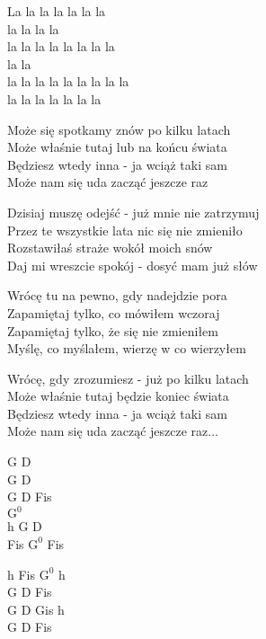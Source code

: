 \begin{text}
    La la la la la la la\\
    la la la la\\
    la la la la la la la la\\
    la la\\
    la la la la la la la la la\\
    la la la la la la la

    Może się spotkamy znów po kilku latach\\
    Może właśnie tutaj lub na końcu świata\\
    Będziesz wtedy inna - ja wciąż taki sam\\
    Może nam się uda zacząć jeszcze raz

    Dzisiaj muszę odejść - już mnie nie zatrzymuj\\
    Przez te wszystkie lata nic się nie zmieniło\\
    Rozstawiłaś straże wokół moich snów\\
    Daj mi wreszcie spokój - dosyć mam już słów

    Wrócę tu na pewno, gdy nadejdzie pora\\
    Zapamiętaj tylko, co mówiłem wczoraj\\
    Zapamiętaj tylko, że się nie zmieniłem\\
    Myślę, co myślałem, wierzę w co wierzyłem

    Wrócę, gdy zrozumiesz - już po kilku latach\\
    Może właśnie tutaj będzie koniec świata\\
    Będziesz wtedy inna - ja wciąż taki sam\\
    Może nam się uda zacząć jeszcze raz...
\end{text}
\begin{chord}
    G D\\
    G D\\
    G D Fis\\
    $\mathrm{G^{0}}$\\
    h G D\\
    Fis $\mathrm{G^{0}}$ Fis

    h Fis $\mathrm{G^{0}}$ h\\
    G D Fis\\
    G D Gis h\\
    G D Fis
\end{chord}
